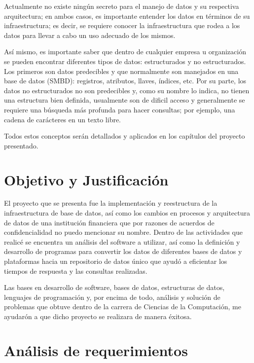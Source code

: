 \documentclass[a4paper,openright,12pt]{book}
\begin{document}
Actualmente no existe ningún secreto para el manejo de datos y su respectiva arquitectura; en ambos casos, es importante entender los datos en términos de su infraestructura; es decir, se requiere conocer la infraestructura que rodea a los datos para llevar a cabo un uso adecuado de los mismos.

Así mismo, es importante saber que dentro de cualquier empresa u organización se pueden encontrar diferentes tipos de datos: estructurados y no estructurados. Los primeros son datos predecibles y que normalmente son manejados en una base de datos (SMBD): registros, atributos, llaves, índices, etc. Por su parte, los datos no estructurados no son predecibles y, como su nombre lo indica, no tienen una estructura bien definida, usualmente son de dificil acceso y generalmente se requiere una búsqueda más profunda para hacer consultas; por ejemplo, una cadena de carácteres en un texto libre. 

Todos estos conceptos serán detallados y aplicados en los capítulos del proyecto presentado.


\chapter*{Objetivo y Justificación} \label{cap.objetivo}%

El proyecto que se presenta fue la implementación y reestructura de la infraestructura de base de datos, así como los cambios en procesos y arquitectura de datos de una institución financiera que por razones de acuerdos de confidencialidad no puedo mencionar su nombre. Dentro de las actividades que realicé se encuentra un análisis del software a utilizar, así como la definición y desarrollo de programas para convertir los datos de diferentes bases de datos y plataformas hacia un repositorio de datos único que ayudó a eficientar los tiempos de respuesta y las consultas realizadas.

Las bases en desarrollo de software, bases de datos, estructuras de datos, lenguajes de programación y, por encima de todo, análisis y solución de problemas que obtuve dentro de la carrera de Ciencias de la Computación, me ayudarón a que dicho proyecto se realizara de manera éxitosa.  



\chapter{Análisis de requerimientos} \label{cap.analisis}%
\end{document}
